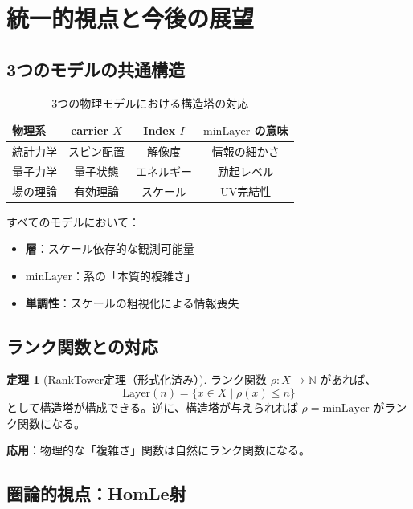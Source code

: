\documentclass[a4paper,12pt]{ltjsarticle}
\theoremstyle{definition}
\newtheorem{theorem}{定理}[section]
\newcommand{\N}{\mathbb{N}}
\newcommand{\Layer}{\mathrm{Layer}}
\newcommand{\minLayer}{\mathrm{minLayer}}
\begin{document}
\section{統一的視点と今後の展望}

\subsection{3つのモデルの共通構造}

\begin{table}[h]
\centering
\begin{tabular}{|l|c|c|c|}
\hline
\textbf{物理系} & \textbf{carrier $X$} & \textbf{Index $I$} & \textbf{$\minLayer$ の意味} \\
\hline
統計力学 & スピン配置 & 解像度 & 情報の細かさ \\
量子力学 & 量子状態 & エネルギー & 励起レベル \\
場の理論 & 有効理論 & スケール & UV完結性 \\
\hline
\end{tabular}
\caption{3つの物理モデルにおける構造塔の対応}
\end{table}

すべてのモデルにおいて：
\begin{itemize}
  \item \textbf{層}：スケール依存的な観測可能量
  \item \textbf{$\minLayer$}：系の「本質的複雑さ」
  \item \textbf{単調性}：スケールの粗視化による情報喪失
\end{itemize}

\subsection{ランク関数との対応}

\begin{theorem}[RankTower定理（形式化済み）]
ランク関数 $\rho : X \to \N$ があれば、
\[
\Layer(n) = \{ x \in X \mid \rho(x) \leq n \}
\]
として構造塔が構成できる。逆に、構造塔が与えられれば $\rho = \minLayer$ がランク関数になる。
\end{theorem}

\textbf{応用}：物理的な「複雑さ」関数は自然にランク関数になる。

\subsection{圏論的視点：HomLe射}
\end{document}
